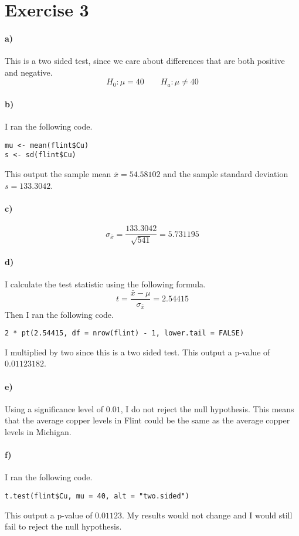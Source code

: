 \documentclass[12pt]{article}
\begin{document}
\section*{Exercise 3}

\paragraph{a)}

This is a two sided test, since we care about differences that are both positive and negative.
\[H_0:\mu=40\qquad H_a:\mu\neq 40\]

\paragraph{b)}

I ran the following code.
\begin{verbatim}
mu <- mean(flint$Cu)
s <- sd(flint$Cu)
\end{verbatim}
This output the sample mean \(\bar{x}=54.58102\) and the sample standard deviation \(s=133.3042\).

\paragraph{c)}

\[\sigma_{\bar{x}}=\frac{133.3042}{\sqrt{541}}=5.731195\]

\paragraph{d)}

I calculate the test statistic using the following formula.
\[t=\frac{\bar{x}-\mu}{\sigma_{\bar{x}}}=2.54415\]
Then I ran the following code.
\begin{verbatim}
2 * pt(2.54415, df = nrow(flint) - 1, lower.tail = FALSE)
\end{verbatim}
I multiplied by two since this is a two sided test. This output a p-value of \(0.01123182\).

\paragraph{e)}

Using a significance level of \(0.01\), I do not reject the null hypothesis. This means that the
average copper levels in Flint could be the same as the average copper levels in Michigan.

\paragraph{f)}

I ran the following code.
\begin{verbatim}
t.test(flint$Cu, mu = 40, alt = "two.sided")
\end{verbatim}
This output a p-value of \(0.01123\). My results would not change and I would still fail to reject
the null hypothesis.
\end{document}
